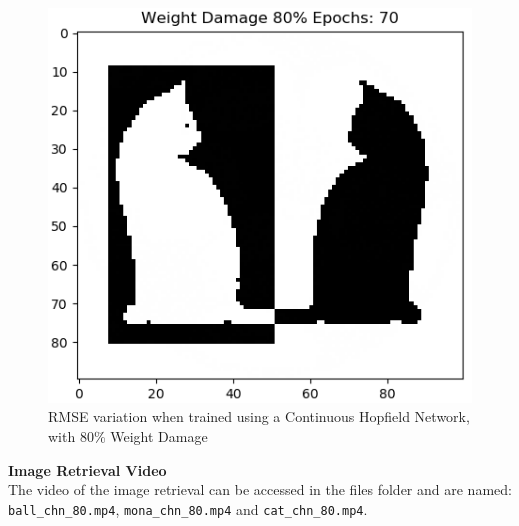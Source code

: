 \documentclass[12pt,a4paper]{article}
\newcommand{\noi}{\noindent}
\def\tt#1{\texttt{#1}}
\begin{document}
\begin{figure}[H]
\includegraphics[scale=0.34]{images/cat_chn_80_end.png}
\caption{RMSE variation when trained using a Continuous Hopfield Network, with 80\% Weight Damage}
\end{figure}

\noi
\textbf{Image Retrieval Video}\\
The video of the image retrieval can be accessed in the files folder and are named: \tt{ball\_chn\_80.mp4}, \tt{mona\_chn\_80.mp4} and \tt{cat\_chn\_80.mp4}.
\end{document}
